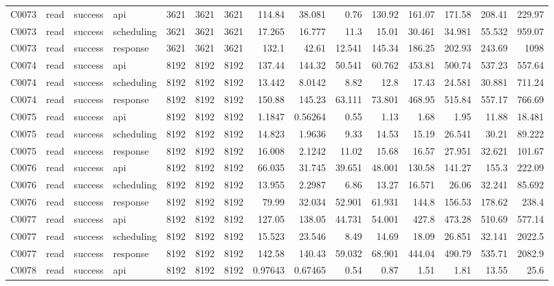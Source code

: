 \begin{landscape}
\begin{longtable}{llllrrrrrrrrrrr}
C0073 & read & success & api & 3621 & 3621 & 3621 & 114.84 & 38.081 & 0.76 & 130.92 & 161.07 & 171.58 & 208.41 & 229.97\\
C0073 & read & success & scheduling & 3621 & 3621 & 3621 & 17.265 & 16.777 & 11.3 & 15.01 & 30.461 & 34.981 & 55.532 & 959.07\\
C0073 & read & success & response & 3621 & 3621 & 3621 & 132.1 & 42.61 & 12.541 & 145.34 & 186.25 & 202.93 & 243.69 & 1098\\
C0074 & read & success & api & 8192 & 8192 & 8192 & 137.44 & 144.32 & 50.541 & 60.762 & 453.81 & 500.74 & 537.23 & 557.64\\
C0074 & read & success & scheduling & 8192 & 8192 & 8192 & 13.442 & 8.0142 & 8.82 & 12.8 & 17.43 & 24.581 & 30.881 & 711.24\\
C0074 & read & success & response & 8192 & 8192 & 8192 & 150.88 & 145.23 & 63.111 & 73.801 & 468.95 & 515.84 & 557.17 & 766.69\\
C0075 & read & success & api & 8192 & 8192 & 8192 & 1.1847 & 0.56264 & 0.55 & 1.13 & 1.68 & 1.95 & 11.88 & 18.481\\
C0075 & read & success & scheduling & 8192 & 8192 & 8192 & 14.823 & 1.9636 & 9.33 & 14.53 & 15.19 & 26.541 & 30.21 & 89.222\\
C0075 & read & success & response & 8192 & 8192 & 8192 & 16.008 & 2.1242 & 11.02 & 15.68 & 16.57 & 27.951 & 32.621 & 101.67\\
C0076 & read & success & api & 8192 & 8192 & 8192 & 66.035 & 31.745 & 39.651 & 48.001 & 130.58 & 141.27 & 155.3 & 222.09\\
C0076 & read & success & scheduling & 8192 & 8192 & 8192 & 13.955 & 2.2987 & 6.86 & 13.27 & 16.571 & 26.06 & 32.241 & 85.692\\
C0076 & read & success & response & 8192 & 8192 & 8192 & 79.99 & 32.034 & 52.901 & 61.931 & 144.8 & 156.53 & 178.62 & 238.4\\
C0077 & read & success & api & 8192 & 8192 & 8192 & 127.05 & 138.05 & 44.731 & 54.001 & 427.8 & 473.28 & 510.69 & 577.14\\
C0077 & read & success & scheduling & 8192 & 8192 & 8192 & 15.523 & 23.546 & 8.49 & 14.69 & 18.09 & 26.851 & 32.141 & 2022.5\\
C0077 & read & success & response & 8192 & 8192 & 8192 & 142.58 & 140.43 & 59.032 & 68.901 & 444.04 & 490.79 & 535.71 & 2082.9\\
C0078 & read & success & api & 8192 & 8192 & 8192 & 0.97643 & 0.67465 & 0.54 & 0.87 & 1.51 & 1.81 & 13.55 & 25.6\\

\end{longtable}
\end{landscape}
